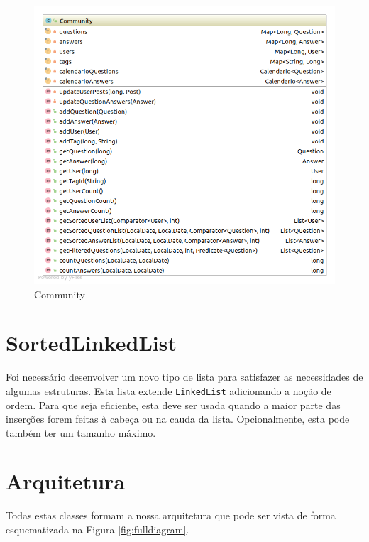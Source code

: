 \documentclass[10pt,a4paper]{report}
\begin{document}
    \begin{figure}[H]
        \centering
        \includegraphics[width=\textwidth]{./images/Community.png}
        \caption{Community}
    \end{figure}

    \section{SortedLinkedList}
    Foi necessário desenvolver um novo tipo de lista para satisfazer as
    necessidades de algumas estruturas.
    Esta lista extende \texttt{LinkedList} adicionando a noção de
    ordem. Para que seja eficiente, esta deve ser usada quando a maior parte
    das inserções forem feitas à cabeça ou na cauda da lista. Opcionalmente,
    esta pode também ter um tamanho máximo.

    \section{Arquitetura}
    Todas estas classes formam a nossa arquitetura que pode ser vista de forma
    esquematizada na Figura \ref{fig:fulldiagram}.
\end{document}
